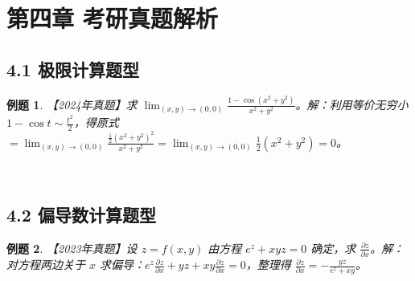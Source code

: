 \documentclass[12pt,a4paper]{article}
\newtheorem*{example}{\heiti 例题}
\begin{document}
\section{第四章  考研真题解析}
\subsection{4.1 极限计算题型}
\begin{example}【2024年真题】求 $\lim_{(x,y)\to(0,0)}\frac{1-\cos(x^2+y^2)}{x^2+y^2}$。解：利用等价无穷小 $1-\cos t\sim\frac{t^2}{2}$，得原式 $=\lim_{(x,y)\to(0,0)}\frac{\frac{1}{2}(x^2+y^2)^2}{x^2+y^2}=\lim_{(x,y)\to(0,0)}\frac{1}{2}(x^2+y^2)=0$。\end{example}\nopagebreak\\
\subsection{4.2 偏导数计算题型}
\begin{example}【2023年真题】设 $z=f(x,y)$ 由方程 $e^z+xyz=0$ 确定，求 $\frac{\partial z}{\partial x}$。解：对方程两边关于 $x$ 求偏导：$e^z\frac{\partial z}{\partial x}+yz+xy\frac{\partial z}{\partial x}=0$，整理得 $\frac{\partial z}{\partial x}=-\frac{yz}{e^z+xy}$。\end{example}\nopagebreak\\
\end{document}
